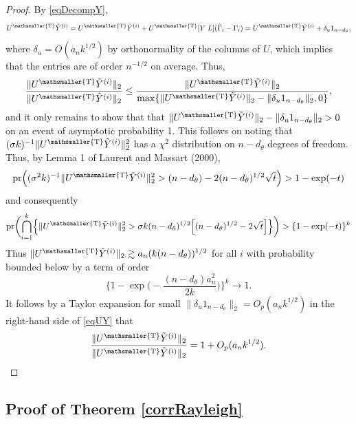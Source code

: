 \documentclass[10pt, reqno]{amsart}
\numberwithin{equation}{section}
\newcommand{\pr}{\mathop{\mathrm{pr}}}
\newcommand{\T}{{\mathsmaller {\rm T}}}
\begin{document}
\begin{appendix}
\begin{proof}
	By \eqref{eqDecompY},
	\[
	U^\T\hat Y^{(i)}=U^\T\tilde{Y}^{(i)} + U^\T[Y \; L](\hat{\Gamma}_i - \Gamma_i) = U^\T\tilde{Y}^{(i)} + \delta_u  1_{n-d_\theta},
	\]
	where $\delta_u=O(a_n k^{1/2})$ by orthonormality of the columns of $U$, which implies that the entries are of order $n^{-1/2}$ on average. Thus, 
	\begin{equation}\label{eqUY}
		\frac{\|U^\T \tilde Y^{(i)}\|_2}{\|U^\T \hat Y^{(i)}\|_2} \leq \frac{\|U^\T \tilde Y^{(i)}\|_2}{\max\{\|U^\T \tilde Y^{(i)}\|_2 - \|\delta_u 1_{n-d_\theta}\|_2,0\}},
	\end{equation}
	and it only remains to show that that $\|U^\T \tilde Y^{(i)}\|_2 - \|\delta_u 1_{n-d_\theta}\|_2>0$ on an event of asymptotic probability 1. This follows on noting that $(\sigma k)^{-1}\|U^\T \tilde{Y}^{(i)}\|_2^2$ has a $\chi^2$ distribution on $n-d_\theta$ degrees of freedom. Thus, by Lemma 1 of Laurent and Massart (2000),
	\[
	\pr\Bigl((\sigma^2 k)^{-1}\|U^\T \tilde{Y}^{(i)}\|_2^2 > (n-d_\theta) - 2(n-d_\theta)^{1/2}\sqrt{t}\Bigr) >  1-\exp(-t)
	\]
	and consequently
	\[
	\pr\biggl(\bigcap_{i=1}^k\Bigl\{\|U^\T \tilde{Y}^{(i)}\|_2^2 > \sigma k(n-d_\theta)^{1/2}\Bigl[(n-d_\theta)^{1/2} - 2\sqrt{t}\Bigr]\Bigr\}\biggr) >  \{1-\exp(-t)\}^k 
	\]
	Thus $\|U^\T \tilde Y^{(i)}\|_2 \gtrsim a_n (k(n-d_\theta))^{1/2}$ for all $i$ with probability bounded below by a term of order
	\[
	\biggl\{1-\exp\biggl(-\frac{(n-d_\theta)a_n^2}{2k}\biggr)\biggr\}^k \rightarrow 1.
	\]
	It follows by a Taylor expansion for small $\|\delta_u 1_{n-d_\theta}\|_2=O_p(a_nk^{1/2})$ in the right-hand side of \eqref{eqUY} that
	\[
	\frac{\|U^\T \tilde Y^{(i)}\|_2}{\|U^\T \hat Y^{(i)}\|_2} = 1 + O_{p}(a_n k^{1/2}).
	\]
\end{proof}


\subsection{Proof of Theorem \ref{corrRayleigh}}



\end{appendix}
\end{document}
